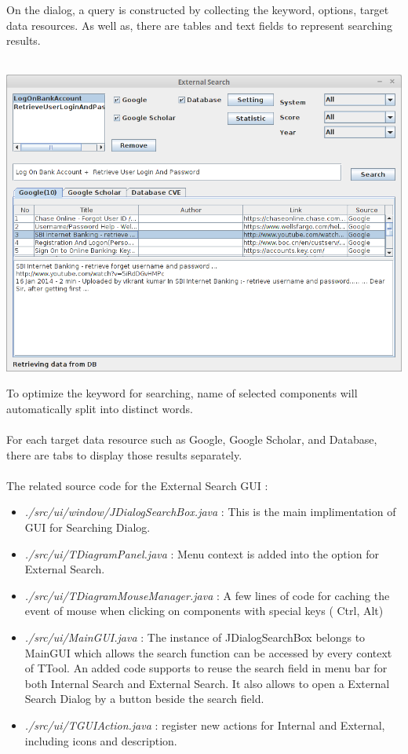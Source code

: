 \documentclass[a4paper,12pt,oneside]{report}
\begin{document}
		On the dialog, a query is constructed by collecting the keyword, options, target data resources. As well as, there are tables and text fields to represent searching results. \\\\
		\begin{center}
		\includegraphics[scale=0.5]{ExternalSearch.png}
		\end{center}
		To optimize the keyword for searching, name of selected components will automatically split into distinct words.\\\\
		For each target data resource such as Google, Google Scholar, and Database, there are tabs to display those results separately.\\\\
		The related source code for the External Search GUI :
		\begin {itemize}
			\item \textit{./src/ui/window/JDialogSearchBox.java} : This is the main implimentation of GUI for Searching Dialog. 
			\item \textit{./src/ui/TDiagramPanel.java} : Menu context is added into the option for External Search.
			\item \textit{./src/ui/TDiagramMouseManager.java} : A few lines of code for caching the event of mouse when clicking on components with special keys ( Ctrl, Alt) 
			\item \textit{./src/ui/MainGUI.java} : The instance of JDialogSearchBox belongs to MainGUI which allows the search function can be accessed by every context of TTool. 
			An added code supports to reuse the search field in menu bar for both Internal Search and External Search. It also allows to open a External Search Dialog by a button beside the search field. 
			\item \textit{./src/ui/TGUIAction.java} : register  new actions for Internal and External, including icons and description.
			
		\end {itemize}
		
\end{document}
